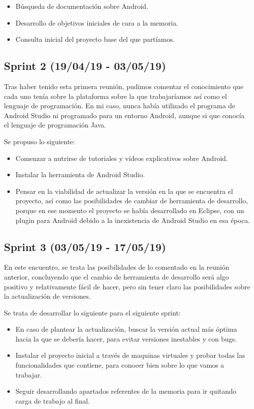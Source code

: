 \begin{itemize}
\item Búsqueda de documentación sobre Android.
\item Desarrollo de objetivos iniciales de cara a la memoria.
\item Consulta inicial del proyecto base del que partíamos.
\end{itemize}

\subsection{Sprint 2 (19/04/19 - 03/05/19)}

Tras haber tenido esta primera reunión, pudimos comentar el conocimiento que cada uno tenía sobre la plataforma sobre la que trabajaríamos así como el lenguaje de programación. En mi caso, nunca había utilizado el programa de Android Studio ni programado para un entorno Android, aunque si que conocía el lenguaje de programación Java.

Se propuso lo siguiente:

\begin{itemize}
\item Comenzar a nutrirse de tutoriales y vídeos explicativos sobre Android.
\item Instalar la herramienta de Android Studio.
\item Pensar en la viabilidad de actualizar la versión en la que se encuentra el proyecto, así como las posibilidades de cambiar de herramienta de desarrollo, porque en ese momento el proyecto se había desarrollado en Eclipse, con un plugin para Android debido a la inexistencia de Android Studio en esa época.
\end{itemize}

\subsection{Sprint 3 (03/05/19 - 17/05/19)}

En este encuentro, se trata las posibilidades de lo comentado en la reunión anterior, concluyendo que el cambio de herramienta de desarrollo será algo positivo y relativamente fácil de hacer, pero sin tener claro las posibilidades sobre la actualización de versiones. 

Se trata de desarrollar lo siguiente para el siguiente sprint:

\begin{itemize}
\item En caso de plantear la actualización, buscar la versión actual más óptima hacia la que se debería hacer, para evitar versiones inestables y con bugs.
\item Instalar el proyecto inicial a través de maquinas virtuales y probar todas las funcionalidades que contiene, para conocer bien sobre lo que vamos a trabajar.
\item Seguir desarrollando apartados referentes de la memoria para ir quitando carga de trabajo al final.
\end{itemize}

